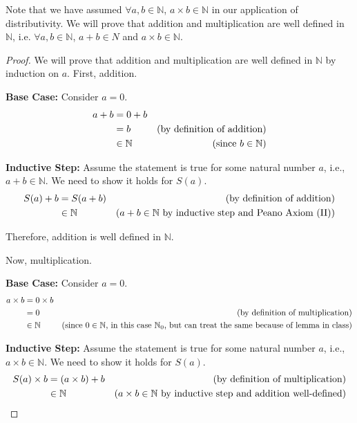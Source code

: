 \documentclass[10pt]{article}
\newcommand{\N}{\mathbb{N}}
\newenvironment{problem}[2][Problem]{\begin{trivlist}
\item[\hskip \labelsep {\bfseries #1}\hskip \labelsep {\bfseries #2.}]}{\end{trivlist}}
\begin{document}
\begin{problem}{1}
\begin{enumerate}
\begin{enumerate}
                    Note that we have assumed $\forall a,b \in \N$, $a \times b \in \N$ in our application of distributivity. We will prove that addition and multiplication are well defined in $\N$, i.e. $\forall a,b \in \N$, $a+b \in N$ and $a \times b \in \N$.

                    \begin{proof}
                        We will prove that addition and multiplication are well defined in $\N$ by induction on $a$. First, addition.

                        \textbf{Base Case:} Consider \( a = 0 \).
                        \begin{align*}
                            a + b &= 0 + b \\
                                  &= b & \text{(by definition of addition)} \hfill \\
                                  &\in \N & \text{(since $b \in \N$)} \hfill
                        \end{align*}

                        \textbf{Inductive Step:} Assume the statement is true for some natural number \( a \), i.e., \( a + b \in \N \). We need to show it holds for \( S(a) \).
                        \begin{align*}
                            S(a) + b &= S(a + b) & \text{(by definition of addition)} \hfill \\
                                     &\in \N & \text{($a + b \in \N$ by inductive step and Peano Axiom (II))} \hfill
                        \end{align*}

                        Therefore, addition is well defined in $\N$.

                        Now, multiplication.

                        \textbf{Base Case:} Consider \( a = 0 \).
                        \begin{align*}
                            a \times b &= 0 \times b \\
                                      &= 0 & \text{(by definition of multiplication)} \hfill \\
                                      &\in \N & \text{(since $0 \in \N$, in this case $\N_0$, but can treat the same because of lemma in class)} \hfill
                        \end{align*}

                        \textbf{Inductive Step:} Assume the statement is true for some natural number \( a \), i.e., \( a \times b \in \N \). We need to show it holds for \( S(a) \).
                        \begin{align*}
                            S(a) \times b &= (a \times b) + b & \text{(by definition of multiplication)} \hfill \\
                                          &\in \N & \text{($a \times b \in \N$ by inductive step and addition well-defined)} \hfill
                        \end{align*}


\end{proof}
\end{enumerate}
\end{enumerate}
\end{problem}
\end{document}
